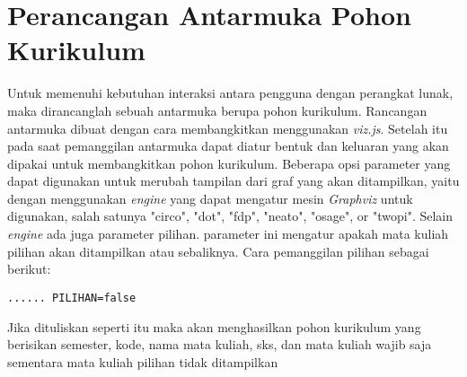 \section{Perancangan Antarmuka Pohon Kurikulum}
\label{sec: Perancangan Antarmuka Pohon Kurikulum}
Untuk memenuhi kebutuhan interaksi antara pengguna dengan perangkat lunak, maka dirancanglah sebuah antarmuka berupa pohon kurikulum. Rancangan antarmuka dibuat dengan cara membangkitkan menggunakan \textit{viz.js}. Setelah itu pada saat pemanggilan antarmuka dapat diatur bentuk dan keluaran yang akan dipakai untuk membangkitkan pohon kurikulum. Beberapa opsi parameter yang dapat digunakan untuk merubah tampilan dari graf yang akan ditampilkan, yaitu dengan menggunakan \textit{engine} yang dapat mengatur mesin \textit{Graphviz} untuk digunakan, salah satunya "circo", "dot", "fdp", "neato", "osage", or "twopi". Selain \textit{engine} ada juga parameter pilihan. parameter ini mengatur apakah mata kuliah pilihan akan ditampilkan atau sebaliknya. Cara pemanggilan pilihan sebagai berikut:
\begin{lstlisting}
...... PILIHAN=false
\end{lstlisting}
Jika dituliskan seperti itu maka akan menghasilkan pohon kurikulum yang berisikan semester, kode, nama mata kuliah, sks, dan mata kuliah wajib saja sementara mata kuliah pilihan tidak ditampilkan

